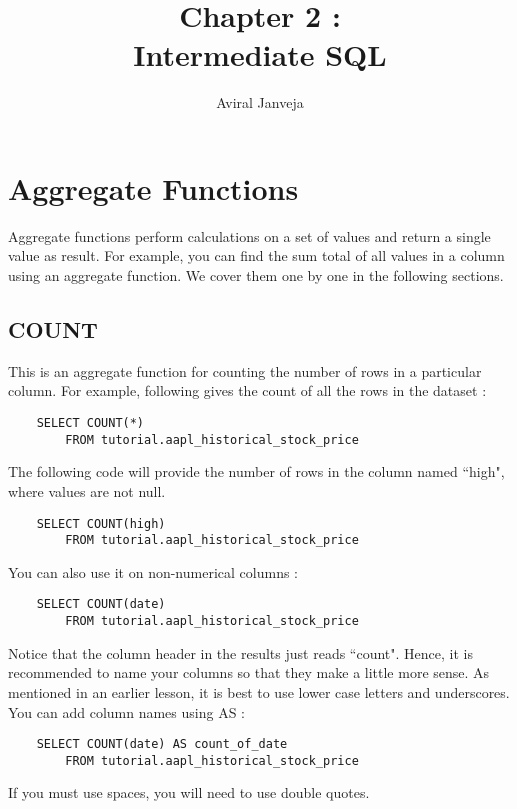 \documentclass[12pt, letterpaper]{article}
\title{\textbf{\Huge Chapter 2 : \\ Intermediate SQL}}
\author{Aviral Janveja}
\date{}
\begin{document}
\maketitle


\section{Aggregate Functions}
Aggregate functions perform calculations on a set of values and return a single value as result. For example, you can find the sum total of all values in a column using an aggregate function. We cover them one by one in the following sections.

\subsection{COUNT}
This is an aggregate function for counting the number of rows in a particular column. For example, following gives the count of all the rows in the dataset : 

\begin{verbatim}
    SELECT COUNT(*)
        FROM tutorial.aapl_historical_stock_price
\end{verbatim}

The following code will provide the number of rows in the column named ``high", where values are not null.

\begin{verbatim}
    SELECT COUNT(high)
        FROM tutorial.aapl_historical_stock_price
\end{verbatim}

You can also use it on non-numerical columns : 

\begin{verbatim}
    SELECT COUNT(date)
        FROM tutorial.aapl_historical_stock_price
\end{verbatim}

Notice that the column header in the results just reads ``count". Hence, it is recommended to name your columns so that they make a little more sense. As mentioned in an earlier lesson, it is best to use lower case letters and underscores. You can add column names using AS : 

\begin{verbatim}
    SELECT COUNT(date) AS count_of_date
        FROM tutorial.aapl_historical_stock_price
\end{verbatim}

If you must use spaces, you will need to use double quotes.
\end{document}
